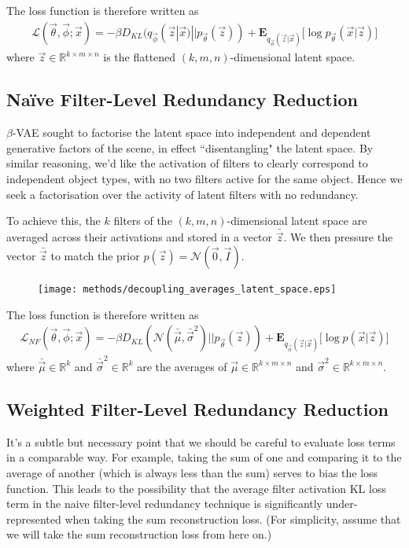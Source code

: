 The loss function is therefore written as 
\begin{align}
\mathcal{L}(\vec{\theta}, \vec{\phi}; \vec{x}) = -\beta D_{KL}(q_{\vec{\phi}}(\vec{z}|\vec{x}) || p_{\vec{\theta}}(\vec{z})) + \mathbf{E}_{q_{\vec{\phi}}(\vec{z}|\vec{x})}\big[\log p_{\vec{\theta}}(\vec{x} | \vec{z}) \big]
\end{align}
where $\vec{z} \in \mathbb{R}^{k \times m \times n}$ is the flattened $(k, m, n)$-dimensional latent space.


%
%
\subsection{Na{\"i}ve Filter-Level Redundancy Reduction}

$\beta$-VAE sought to factorise the latent space into independent and dependent generative factors of the scene, in effect ``disentangling" the latent space. By similar reasoning, we'd like the activation of filters to clearly correspond to independent object types, with no two filters active for the same object. Hence we seek a factorisation over the activity of latent filters with no redundancy.

To achieve this, the $k$ filters of the $(k, m, n)$-dimensional latent space are averaged across their activations and stored in a vector $\bar{\vec{z}}$. We then pressure the vector $\bar{\vec{z}}$ to match the prior $p(\vec{z}) = \mathcal{N}(\vec{0}, \vec{I})$.\\

\begin{figure}[H]
\centering
\captionsetup{justification=centering}
\texttt{[image: methods/decoupling\_averages\_latent\_space.eps]}
\label{fig:decoupling_averages_latent_space}
\end{figure}

The loss function is therefore written as 
\begin{align}
\mathcal{L}_{NF}(\vec{\theta}, \vec{\phi}; \vec{x}) = -\beta D_{KL}(\mathcal{N}(\bar{\vec{\mu}}, \bar{\vec{\sigma}}^2) || p_{\vec{\theta}}(\vec{z})) + \mathbf{E}_{q_{\vec{\phi}}(\vec{z}|\vec{x})}\big[\log p(\vec{x} | \vec{z}) \big]
\end{align}
where $\bar{\vec{\mu}} \in \mathbb{R}^{k}$ and $\bar{\vec{\sigma}}^2 \in \mathbb{R}^{k}$ are the averages of $\vec{\mu} \in \mathbb{R}^{k\times m\times n}$ and $\vec{\sigma}^2\in \mathbb{R}^{k\times m\times n}$.


%
%
\subsection{Weighted Filter-Level Redundancy Reduction}
It's a subtle but necessary point that we should be careful to evaluate loss terms in a comparable way. For example, taking the sum of one and comparing it to the average of another (which is always less than the sum) serves to bias the loss function. This leads to the possibility that the average filter activation KL loss term in the naive filter-level redundancy technique is significantly under-represented when taking the sum reconstruction loss. (For simplicity, assume that we will take the sum reconstruction loss from here on.)

